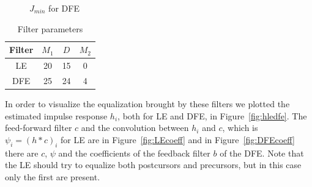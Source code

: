 \documentclass[10pt]{article}
\begin{document}
\begin{figure}
	\centering
	\caption{$J_{min}$ for DFE}
	\label{fig:jmindfe}
\end{figure}


\begin{table}[h!]
	\centering
	\begin{tabular}{c|c|c|c}
	Filter 	& 	$M_1$	& 	$D$		&		$M_2$		\\ \hline
	LE 		&	20		&	15		&		0			\\
	DFE 	&	25		&	24		&		4			\\
	\end{tabular}
	\caption{Filter parameters}
	\label{table:ledfe}
\end{table}

In order to visualize the equalization brought by these filters we plotted the estimated impulse response $h_i$, both for LE and DFE, in Figure~\ref{fig:hledfe}. The feed-forward filter $c$ and the convolution between $h_i$ and $c$, which is $\psi_i = (h*c)_i$ for LE are in Figure~\ref{fig:LEcoeff} and in Figure~\ref{fig:DFEcoeff} there are $c$, $\psi$ and the coefficients of the feedback filter $b$ of the DFE. Note that the LE should try to equalize both postcursors and precursors, but in this case only the first are present. 
\end{document}
